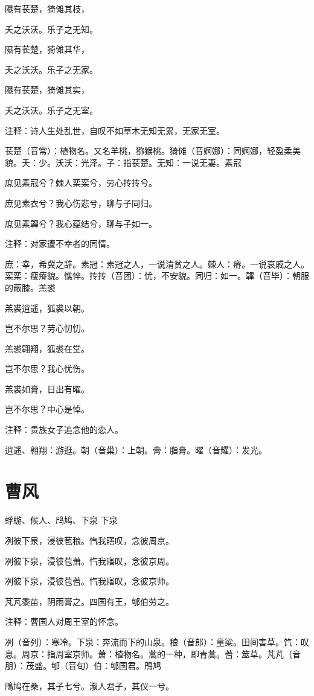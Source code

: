 \documentclass[12pt,UTF8]{ctexbook}
\begin{document}
隰有苌楚，猗傩其枝，

夭之沃沃。乐子之无知。

隰有苌楚，猗傩其华，

夭之沃沃。乐子之无家。

隰有苌楚，猗傩其实，

夭之沃沃。乐子之无室。

注释：诗人生处乱世，自叹不如草木无知无累，无家无室。

苌楚（音常）：植物名。又名羊桃，猕猴桃。猗傩（音婀娜）：同婀娜，轻盈柔美貌。夭：少。沃沃：光泽。子：指苌楚。无知：一说无妻。素冠

庶见素冠兮？棘人栾栾兮，劳心抟抟兮。

庶见素衣兮？我心伤悲兮，聊与子同归。

庶见素韠兮？我心蕴结兮，聊与子如一。

注释：对家遭不幸者的同情。

庶：幸，希冀之辞。素冠：素冠之人，一说清贫之人。棘人：瘠。一说哀戚之人。栾栾：瘦瘠貌。憔悴。抟抟（音团）：忧，不安貌。同归：如一。韠（音毕）：朝服的蔽膝。羔裘

羔裘逍遥，狐裘以朝。

岂不尔思？劳心忉忉。

羔裘翱翔，狐裘在堂。

岂不尔思？我心忧伤。

羔裘如膏，日出有曜。

岂不尔思？中心是悼。

注释：贵族女子追念他的恋人。

逍遥、翱翔：游逛。朝（音巢）：上朝。膏：脂膏。曜（音耀）：发光。



\part{曹风}
蜉蝣、候人、鸤鸠、下泉
下泉

冽彼下泉，浸彼苞稂。忾我寤叹，念彼周京。

冽彼下泉，浸彼苞萧。忾我寤叹，念彼京周。

冽彼下泉，浸彼苞蓍。忾我寤叹，念彼京师。

芃芃黍苗，阴雨膏之。四国有王，郇伯劳之。

注释：曹国人对周王室的怀念。

冽（音列）：寒冷。下泉：奔流而下的山泉。稂（音郎）：童粱。田间害草。饩：叹息。周京：指周室京师。萧：植物名。蒿的一种，即青蒿。蓍：筮草。芃芃（音朋）：茂盛。郇（音旬）伯：郇国君。鳲鸠

鳲鸠在桑，其子七兮。淑人君子，其仪一兮。
\end{document}
